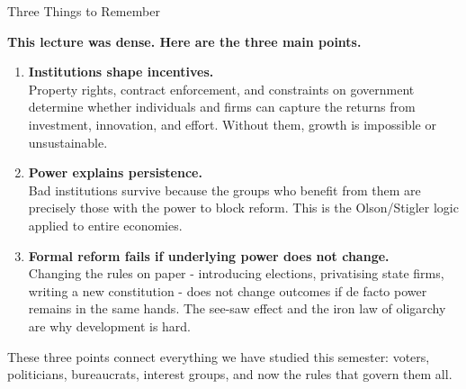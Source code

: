 \documentclass[10pt]{beamer}
\begin{document}
\begin{frame}[allowframebreaks]{Three Things to Remember}

\textbf{This lecture was dense. Here are the three main points.}


\begin{enumerate}
\item \textbf{Institutions shape incentives.} \\[3pt]
\footnotesize Property rights, contract enforcement, and constraints on government determine whether individuals and firms can capture the returns from investment, innovation, and effort. Without them, growth is impossible or unsustainable.


\item \textbf{Power explains persistence.} \\[3pt]
\footnotesize Bad institutions survive because the groups who benefit from them are precisely those with the power to block reform. This is the Olson/Stigler logic applied to entire economies.


\item \textbf{Formal reform fails if underlying power does not change.} \\[3pt]
\footnotesize Changing the rules on paper - introducing elections, privatising state firms, writing a new constitution - does not change outcomes if de facto power remains in the same hands. The see-saw effect and the iron law of oligarchy are why development is hard.
\end{enumerate}


\alert{These three points connect everything we have studied this semester: voters, politicians, bureaucrats, interest groups, and now the rules that govern them all.}
\end{frame}
\end{document}
